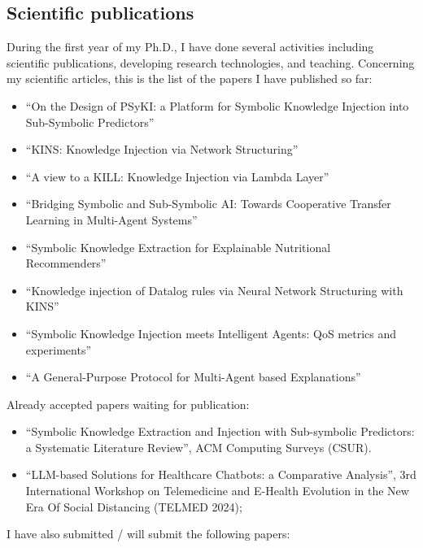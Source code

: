 \documentclass[]{scrartcl}
\begin{document}
    \subsection{Scientific publications}
    \label{sec:done:publications}
    During the first year of my Ph.D., I have done several activities including scientific publications, developing research technologies, and teaching.
    Concerning my scientific articles, this is the list of the papers I have published so far:
    \begin{itemize}
        \item ``On the Design of PSyKI: a Platform for Symbolic Knowledge Injection into Sub-Symbolic Predictors''~\cite{psyki-extraamas2022}
        \item ``KINS: Knowledge Injection via Network Structuring''~\cite{kins-cilc2022}
        \item ``A view to a KILL: Knowledge Injection via Lambda Layer''~\cite{kill-woa2022}
        \item ``Bridging Symbolic and Sub-Symbolic AI: Towards Cooperative Transfer Learning in Multi-Agent Systems''~\cite{ctl-aixia2022}
        \item ``Symbolic Knowledge Extraction for Explainable Nutritional Recommenders''~\cite{skerecommender-cmbp235}
        \item ``Knowledge injection of Datalog rules via Neural Network Structuring with KINS''~\cite{kins-jlc2023}
        \item ``Symbolic Knowledge Injection meets Intelligent Agents: QoS metrics and experiments''~\cite{skiqos-jaamas37}
        \item ``A General-Purpose Protocol for Multi-Agent based Explanations''~\cite{explanationprotocol-extraamas2023}
    \end{itemize}
    Already accepted papers waiting for publication:
    \begin{itemize}
        \item ``Symbolic Knowledge Extraction and Injection with Sub-symbolic Predictors: a Systematic Literature Review'', ACM Computing Surveys (CSUR).
        \item ``LLM-based Solutions for Healthcare Chatbots: a Comparative Analysis'', 3rd International Workshop on Telemedicine and E-Health Evolution in the New Era Of Social Distancing (TELMED 2024);
    \end{itemize}
    I have also submitted / will submit the following papers:
\end{document}
